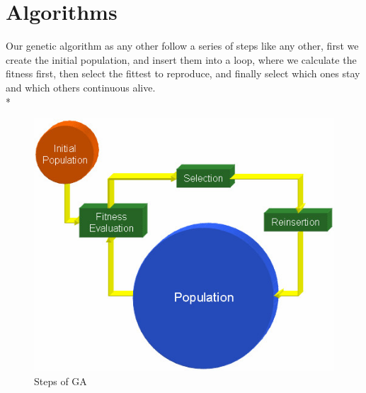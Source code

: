 \documentclass[twocolumn]{IEEEtran}
\begin{document}
   
   
   
\section{Algorithms}

Our genetic algorithm as any other follow a series of steps like any other, first we create the initial
population, and insert them into a loop\cite{GADarrelWitley}, where we calculate the fitness first, then select the fittest to reproduce, and finally select which ones stay and which others continuous alive.\cite{Electrophysiological} \cite{3} \\* 
    \begin{figure}[h!]
	\centering
	\includegraphics[width=\columnwidth]{src/GAalg.jpg}
	\caption{Steps of GA}
	\end{figure}
    
\end{document}
